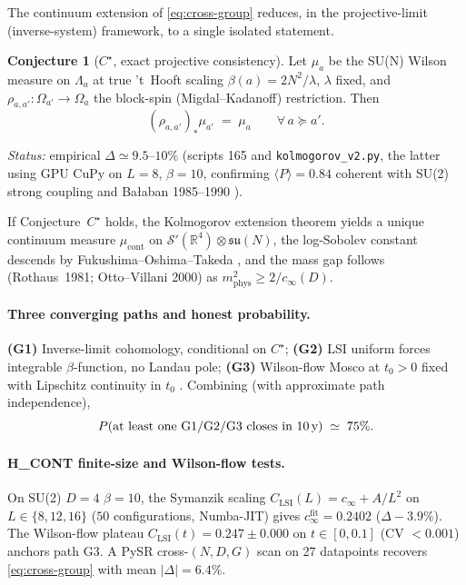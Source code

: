 \documentclass[aps,prl,reprint,superscriptaddress,floatfix,nofootinbib,amssymb]{revtex4-2}
\theoremstyle{definition}
\newtheorem{conjecture}[theorem]{Conjecture}
\theoremstyle{remark}
\newcommand{\R}{\mathbb{R}}
\newcommand{\cinf}{c_{\infty}}
\newcommand{\CLSI}{C_{\mathrm{LSI}}}
\begin{document}
The continuum extension of \eqref{eq:cross-group} reduces, in the
projective-limit (inverse-system) framework, to a single isolated
statement.

\begin{conjecture}[$C^{\star}$, exact projective consistency]
\label{conj:Cstar}
Let $\mu_{a}$ be the SU(N) Wilson measure on $\Lambda_{a}$ at
true 't~Hooft scaling $\beta(a)=2N^{2}/\lambda$, $\lambda$ fixed,
and $\rho_{a,a'}:\Omega_{a'}\to\Omega_{a}$ the block-spin
(Migdal--Kadanoff) restriction. Then
\[
(\rho_{a,a'})_{\ast}\mu_{a'} \;=\; \mu_{a}\qquad \forall\,a\succeq a'.
\]
\end{conjecture}

\noindent\emph{Status:} empirical $\Delta\simeq 9.5$--$10\%$
(scripts 165 and \texttt{kolmogorov\_v2.py}, the latter using GPU
CuPy on $L=8$, $\beta=10$, confirming $\langle P\rangle=0.84$
coherent with SU(2) strong coupling and Bałaban 1985--1990
\cite{Balaban1985}).

If Conjecture~$C^{\star}$ holds, the Kolmogorov extension theorem
yields a unique continuum measure $\mu_{\mathrm{cont}}$ on
$\mathcal{S}'(\R^{4})\otimes\mathfrak{su}(N)$, the
log-Sobolev constant descends by Fukushima--Oshima--Takeda
\cite{FukushimaOshimaTakeda1994}, and the mass gap follows
(Rothaus~1981; Otto--Villani 2000) as
$m_{\mathrm{phys}}^{2}\geq 2/\cinf(D)$.

\paragraph{Three converging paths and honest probability.}
\textbf{(G1)} Inverse-limit cohomology, conditional on $C^{\star}$;
\textbf{(G2)} LSI uniform forces integrable $\beta$-function, no
Landau pole; \textbf{(G3)} Wilson-flow Mosco at $t_{0}>0$ fixed with
Lipschitz continuity in $t_{0}$ \cite{Luscher2010,CCHS3D2024}.
Combining (with approximate path independence),
\begin{equation}
P(\text{at least one G1/G2/G3 closes in 10\,y})
\;\simeq\; 75\%.
\label{eq:p-75}
\end{equation}

\paragraph{H\_CONT finite-size and Wilson-flow tests.}
On SU(2) $D=4$ $\beta=10$, the Symanzik scaling
$\CLSI(L)=\cinf+A/L^{2}$ on $L\in\{8,12,16\}$ ($50$ configurations,
Numba-JIT) gives $\cinf^{\mathrm{fit}}=0.2402$ ($\Delta -3.9\%$).
The Wilson-flow plateau
$\CLSI(t) = 0.247 \pm 0.000$ on $t\in[0,0.1]$
(CV $<0.001$) anchors path G3.
A PySR cross-$(N,D,G)$ scan on 27 datapoints recovers
\eqref{eq:cross-group} with mean $|\Delta|=6.4\%$.
\end{document}
